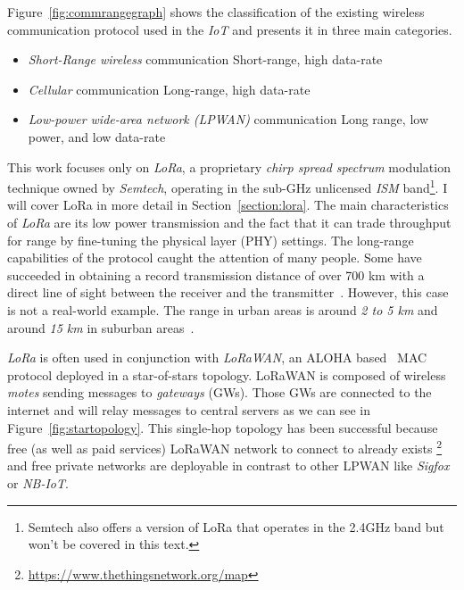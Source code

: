 Figure~\ref{fig:commrangegraph} shows the classification
of the existing wireless communication protocol used in the \emph{IoT} and
presents it in three main categories.

\begin{itemize}
    \item \emph{Short-Range wireless} communication Short-range, high data-rate
    \item \emph{Cellular} communication Long-range, high data-rate
    \item \emph{Low-power wide-area network (LPWAN)} communication Long range,
        low power, and low data-rate
\end{itemize}



This work focuses only on \emph{LoRa}, a proprietary \emph{chirp spread spectrum}
modulation technique owned by \emph{Semtech}, operating in the sub-GHz
unlicensed \emph{ISM} band\footnote{Semtech also offers a version of LoRa that
operates in the 2.4GHz band but won't be covered in this text.}. I will cover LoRa 
in more detail in Section~\ref{section:lora}.
The main characteristics of \emph{LoRa} are its low power transmission and the
fact that it can trade throughput for range by fine-tuning the physical layer
(PHY) settings.
The long-range capabilities of the protocol caught the attention of
many people. 
Some have succeeded in obtaining a record transmission distance of over 700 km with
a direct line of sight between the receiver and the
transmitter~\cite{network_2017}.
However, this case is not a real-world example. The range in urban areas is
around \emph{2 to 5 km} and around \emph{15 km} in suburban
areas~\cite{8030482}.

\emph{LoRa} is often used in conjunction with \emph{LoRaWAN}, an ALOHA 
based~\cite{loraalliance:lorawanspecification} MAC protocol deployed in a star-of-stars 
topology.
LoRaWAN is composed of wireless \emph{motes} sending messages to \emph{gateways} (GWs).
Those GWs are connected to the internet and will relay messages to central servers
as we can see in Figure~\ref{fig:startopology}.
This single-hop topology has been successful because free (as well as paid
services) LoRaWAN network to connect to already exists
\footnote{\url{https://www.thethingsnetwork.org/map}} and free private networks are
deployable in contrast to other LPWAN like \emph{Sigfox} or \emph{NB-IoT}.

